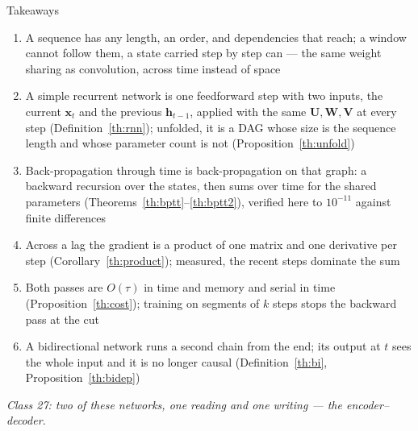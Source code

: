 \documentclass[aspectratio=169, 11pt]{beamer}
\newcommand{\bridge}[1]{%
  {\scriptsize\itshape\color{mcMuted} #1\par}\vspace{0.35em}}
\begin{document}
\begin{frame}{Takeaways}
  \vspace{-0.1em}
  {\scriptsize
  \begin{enumerate}\itemsep0.24em
    \item A sequence has any length, an order, and dependencies that
          reach; a window cannot follow them, a state carried step by step
          can --- the same weight sharing as convolution, across time
          instead of space
    \item A simple recurrent network is one feedforward step with two
          inputs, the current $\mathbf{x}_t$ and the previous $\mathbf{h}_{t-1}$,
          applied with the same $\mathbf{U}, \mathbf{W}, \mathbf{V}$ at every
          step (Definition~\ref{th:rnn}); unfolded, it is a DAG whose size
          is the sequence length and whose parameter count is not
          (Proposition~\ref{th:unfold})
    \item Back-propagation through time is back-propagation on that
          graph: a backward recursion over the states, then sums over time
          for the shared parameters (Theorems~\ref{th:bptt}--\ref{th:bptt2}),
          verified here to $10^{-11}$ against finite differences
    \item Across a lag the gradient is a product of one matrix and one
          derivative per step (Corollary~\ref{th:product}); measured, the
          recent steps dominate the sum
    \item Both passes are $O(\tau)$ in time and memory and serial in time
          (Proposition~\ref{th:cost}); training on segments of $k$ steps
          stops the backward pass at the cut
    \item A bidirectional network runs a second chain from the end; its
          output at $t$ sees the whole input and it is no longer causal
          (Definition~\ref{th:bi}, Proposition~\ref{th:bidep})
  \end{enumerate}}
  \vspace{-0.2em}
  \bridge{Class 27: two of these networks, one reading and one writing --- the encoder--decoder.}
\end{frame}
\end{document}
